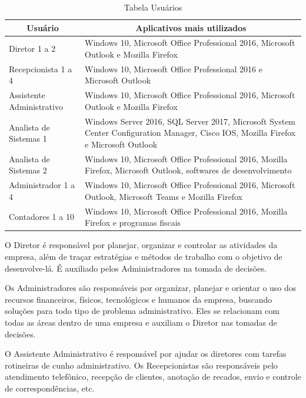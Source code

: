 \documentclass[	DIV=calc,%
							paper=a4,%
							fontsize=12pt,%
							onecolumn]{scrartcl}	 					%
\begin{document}
\begin{table}[t]
	\begin{tabular}{|p{5cm}|p{11cm}|}
		\hline
		\multicolumn{1}{|c|}{\textbf{Usuário}} & \multicolumn{1}{c|}{\textbf{Aplicativos mais utilizados}}                                                                           \\ \hline
		Diretor 1 a 2 & Windows 10, Microsoft Office Professional 2016, Microsoft Outlook e Mozilla Firefox 
		\\ \hline
		Recepcionista 1 a 4 & Windows 10, Microsoft Office Professional 2016 e Microsoft Outlook                                                               \\ \hline
		Assistente Administrativo & Windows 10, Microsoft Office Professional 2016, Microsoft Outlook e Mozilla Firefox 
		\\ \hline
		Analista de Sistemas 1 & Windows Server 2016, SQL Server 2017, Microsoft System Center Configuration Manager, Cisco IOS, Mozilla Firefox e Microsoft Outlook 
		\\ \hline
		Analista de Sistemas 2 & Windows 10, Microsoft Office Professional 2016, Mozilla Firefox, Microsoft Outlook, softwares de desenvolvimento                    
		\\ \hline
		Administrador 1 a 4 & Windows 10, Microsoft Office Professional 2016, Microsoft Outlook, Microsoft Teams e Mozilla Firefox 
		\\ \hline
		Contadores 1 a 10 & Windows 10, Microsoft Office Professional 2016, Mozilla Firefox e programas fiscais 
		\\ \hline
	\end{tabular}
	\caption{Tabela Usuários}
	\label{tab:usuarios}
\end{table}

O Diretor é responsável por planejar, organizar e controlar as atividades da empresa, além de traçar estratégias e métodos de trabalho com o objetivo de desenvolve-lá. É auxiliado pelos Administradores na tomada de decisões. 

Os Administradores são responsáveis por organizar, planejar e orientar o uso dos recursos financeiros, físicos, tecnológicos e humanos da empresa, buscando soluções para todo tipo de problema administrativo. Eles se relacionam com todas as áreas dentro de uma empresa e auxiliam o Diretor nas tomadas de decisões.

O Assistente Administrativo é responsável por ajudar os diretores com tarefas rotineiras de cunho administrativo.
Os Recepcionistas são responsáveis pelo atendimento telefônico, recepção de clientes, anotação de recados, envio e controle de correspondências, etc.
\end{document}
